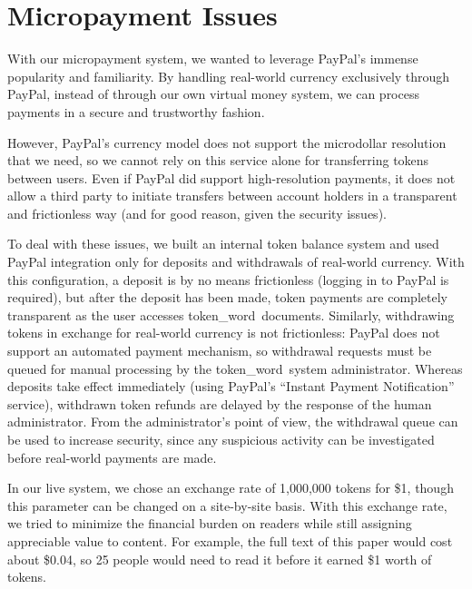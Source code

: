 \documentclass{acm_proc_article-sp}
\newcommand{\tokenWord}{token\_word}
\begin{document}


\section{Micropayment Issues}
With our micropayment system, we wanted to leverage PayPal's \cite{paypal} immense popularity and familiarity.
By handling real-world currency exclusively through PayPal, instead of through our own virtual money system, we can process payments in a secure and trustworthy fashion.

However, PayPal's currency model does not support the microdollar resolution that we need, so we cannot rely on this service alone for transferring tokens between users.
Even if PayPal did support high-resolution payments, it does not allow a third party to initiate transfers between account holders in a transparent and frictionless way (and for good reason, given the security issues).

To deal with these issues, we built an internal token balance system and used PayPal integration only for deposits and withdrawals of real-world currency.
With this configuration, a deposit is by no means frictionless (logging in to PayPal is required), but after the deposit has been made, token payments are completely transparent as the user accesses \tokenWord \  documents.
Similarly, withdrawing tokens in exchange for real-world currency is not frictionless: 
PayPal does not support an automated payment mechanism, so withdrawal requests must be queued for manual processing by the \tokenWord \  system administrator.
Whereas deposits take effect immediately (using PayPal's ``Instant Payment Notification'' service), withdrawn token refunds are delayed by the response of the human administrator.
From the administrator's point of view, the withdrawal queue can be used to increase security, since any suspicious activity can be investigated before real-world payments are made.  

In our live system, we chose an exchange rate of 1,000,000 tokens for \$1, though this parameter can be changed on a site-by-site basis.
With this exchange rate, we tried to minimize the financial burden on readers while still assigning appreciable value to content.
For example, the full text of this paper would cost about \$0.04, so 25 people would need to read it before it earned \$1 worth of tokens.
\end{document}
